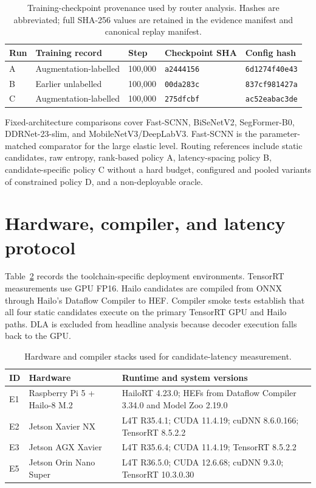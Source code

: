 \documentclass[a4paper,review,12pt]{elsarticle}
\begin{document}
\begin{table}[H]
\centering
\caption{Training-checkpoint provenance used by router analysis. Hashes are abbreviated; full SHA-256 values are retained in the evidence manifest and canonical replay manifest.}
\label{tab:provenance}
\small
\begin{tabularx}{\textwidth}{@{}lXlll@{}}
\toprule
Run & Training record & Step & Checkpoint SHA & Config hash \\
\midrule
A & Augmentation-labelled & 100,000 & \texttt{a2444156} & \texttt{6d1274f40e43} \\
B & Earlier unlabelled & 100,000 & \texttt{00da283c} & \texttt{837cf981427a} \\
C & Augmentation-labelled & 100,000 & \texttt{275dfcbf} & \texttt{ac52eabac3de} \\
\bottomrule
\end{tabularx}
\end{table}

Fixed-architecture comparisons cover Fast-SCNN, BiSeNetV2, SegFormer-B0, DDRNet-23-slim, and MobileNetV3/DeepLabV3. Fast-SCNN is the parameter-matched comparator for the large elastic level. Routing references include static candidates, raw entropy, rank-based policy A, latency-spacing policy B, candidate-specific policy C without a hard budget, configured and pooled variants of constrained policy D, and a non-deployable oracle.

\section{Hardware, compiler, and latency protocol}

Table~\ref{tab:hardware} records the toolchain-specific deployment environments. TensorRT measurements use GPU FP16. Hailo candidates are compiled from ONNX through Hailo's Dataflow Compiler to HEF. Compiler smoke tests establish that all four static candidates execute on the primary TensorRT GPU and Hailo paths. DLA is excluded from headline analysis because decoder execution falls back to the GPU.

\begin{table}[H]
\centering
\caption{Hardware and compiler stacks used for candidate-latency measurement.}
\label{tab:hardware}
\small
\begin{tabularx}{\textwidth}{@{}llX@{}}
\toprule
ID & Hardware & Runtime and system versions \\
\midrule
E1 & Raspberry Pi 5 + Hailo-8 M.2 & HailoRT 4.23.0; HEFs from Dataflow Compiler 3.34.0 and Model Zoo 2.19.0 \\
E2 & Jetson Xavier NX & L4T R35.4.1; CUDA 11.4.19; cuDNN 8.6.0.166; TensorRT 8.5.2.2 \\
E3 & Jetson AGX Xavier & L4T R35.6.4; CUDA 11.4.19; TensorRT 8.5.2.2 \\
E5 & Jetson Orin Nano Super & L4T R36.5.0; CUDA 12.6.68; cuDNN 9.3.0; TensorRT 10.3.0.30 \\
\bottomrule
\end{tabularx}
\end{table}
\end{document}
